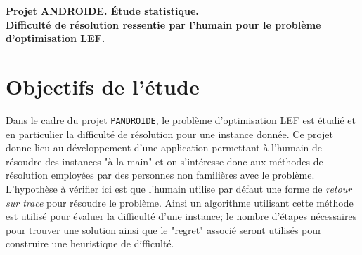 \documentclass[a4paper, 10pt]{article}
\begin{document}
	\begin{center}
		\textbf{Projet ANDROIDE. Étude statistique.}\\
		\textbf{Difficulté de résolution ressentie par l'humain pour le problème d'optimisation LEF.}\\[0.5cm]
	\end{center}
	
	\section*{Objectifs de l'étude}
	
	Dans le cadre du projet \texttt{PANDROIDE}, le problème d'optimisation LEF est étudié et en particulier la difficulté de résolution pour une instance donnée. Ce projet donne lieu au développement d'une application permettant à l'humain de résoudre des instances "à la main" et on s'intéresse donc aux méthodes de résolution employées par des personnes non familières avec le problème.\\
	
	L'hypothèse à vérifier ici est que l'humain utilise par défaut une forme de \textit{retour sur trace} pour résoudre le problème. Ainsi un algorithme utilisant cette méthode est utilisé pour évaluer la difficulté d'une instance; le nombre d'étapes nécessaires pour trouver une solution ainsi que le "regret" associé seront utilisés pour construire une heuristique de difficulté.
	
\end{document}
